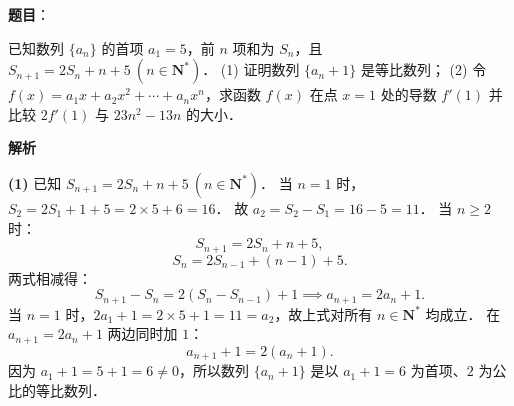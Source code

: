 \begin{answer}

\textbf{题目}：

已知数列 $\{a_n\}$ 的首项 $a_1 = 5$，前 $n$ 项和为 $S_n$，且 $S_{n+1} = 2S_n + n + 5\ (n \in \mathbf{N}^*)$．
(1) 证明数列 $\{a_n + 1\}$ 是等比数列；
(2) 令 $f(x) = a_1 x + a_2 x^2 + \cdots + a_n x^n$，求函数 $f(x)$ 在点 $x = 1$ 处的导数 $f'(1)$ 并比较 $2f'(1)$ 与 $23n^2 - 13n$ 的大小．

\textbf{解析}

\textbf{(1)}
已知 $S_{n+1} = 2S_n + n + 5\ (n \in \mathbf{N}^*)$．
当 $n = 1$ 时，$S_2 = 2S_1 + 1 + 5 = 2 \times 5 + 6 = 16$．
故 $a_2 = S_2 - S_1 = 16 - 5 = 11$．
当 $n \geqslant 2$ 时：
\nopagebreak[4]
\[
S_{n+1} = 2S_n + n + 5,
\]
\nopagebreak[4]
\[
S_n = 2S_{n-1} + (n-1) + 5.
\]
两式相减得：
\nopagebreak[4]
\[
S_{n+1} - S_n = 2(S_n - S_{n-1}) + 1 \implies a_{n+1} = 2a_n + 1.
\]
当 $n = 1$ 时，$2a_1 + 1 = 2 \times 5 + 1 = 11 = a_2$，故上式对所有 $n \in \mathbf{N}^*$ 均成立．
在 $a_{n+1} = 2a_n + 1$ 两边同时加 $1$：
\nopagebreak[4]
\[
a_{n+1} + 1 = 2(a_n + 1).
\]
因为 $a_1 + 1 = 5 + 1 = 6 \neq 0$，所以数列 $\{a_n + 1\}$ 是以 $a_1 + 1 = 6$ 为首项、$2$ 为公比的等比数列．


\end{answer}
